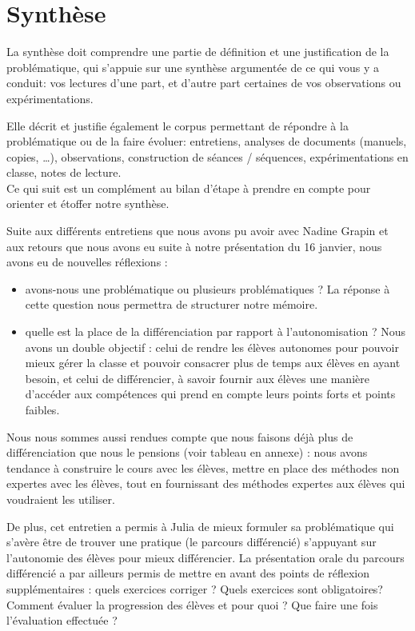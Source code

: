 \section{Synthèse}
{\color{red}La synthèse doit comprendre une partie de définition et une justification de la problématique, qui s'appuie sur une synthèse argumentée de ce qui vous y a conduit: vos lectures d'une part, et d'autre part certaines de vos observations ou expérimentations.

Elle décrit et justifie également le corpus permettant de répondre à la problématique ou de la faire évoluer: entretiens, analyses de documents (manuels, copies, …), observations, construction de séances / séquences, expérimentations en classe, notes de lecture.\\

Ce qui suit est un complément au bilan d'étape à prendre en compte pour orienter et étoffer notre synthèse.}

Suite aux différents entretiens que nous avons pu avoir avec Nadine Grapin et aux retours que nous avons eu suite à notre présentation du 16 janvier, nous avons eu de nouvelles réflexions :
\begin{itemize}
    \item avons-nous une problématique ou plusieurs problématiques ? La réponse à cette question nous permettra de structurer notre mémoire.
    \item quelle est la place de la différenciation par rapport à l’autonomisation ? Nous avons un double objectif : celui de rendre les élèves autonomes pour pouvoir mieux gérer la classe et pouvoir consacrer plus de temps aux élèves en ayant besoin, et celui de différencier, à savoir fournir aux élèves une manière d’accéder aux compétences qui prend en compte leurs points forts et points faibles.
\end{itemize}

Nous nous sommes aussi rendues compte que nous faisons déjà plus de différenciation que nous le pensions (voir tableau en annexe) : nous avons tendance à construire le cours avec les élèves, mettre en place des méthodes non expertes avec les élèves, tout en fournissant des méthodes expertes aux élèves qui voudraient les utiliser.

De plus, cet entretien a permis à Julia de mieux formuler sa problématique qui s’avère être de trouver une pratique (le parcours différencié) s’appuyant sur l’autonomie des élèves pour mieux différencier. La présentation orale du parcours différencié a par ailleurs permis de mettre en avant des points de réflexion supplémentaires : quels exercices corriger ? Quels exercices sont obligatoires? Comment évaluer la progression des élèves et pour quoi ? Que faire une fois l’évaluation effectuée ?\\

